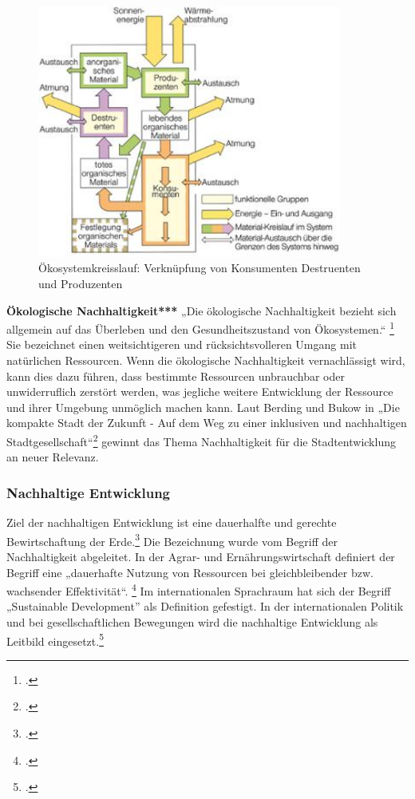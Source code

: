 \documentclass{scrartcl}
\begin{document}
\begin{figure}[htbp]
\centering
\includegraphics[width=10cm]{image_folder/oekosystemkreisslauf.png}
\caption{Ökosystemkreisslauf: Verknüpfung von Konsumenten Destruenten und Produzenten}
\label{fig:Ökosystemkreisslauf}
\end{figure}

\textbf{Ökologische Nachhaltigkeit***}
„Die ökologische Nachhaltigkeit bezieht sich allgemein auf das Überleben und den Gesundheitszustand von Ökosystemen.“ \footcite{DefinitionWirtschaftslexikonc} Sie bezeichnet einen weitsichtigeren und rücksichtsvolleren Umgang mit natürlichen Ressourcen. Wenn die ökologische Nachhaltigkeit vernachlässigt wird, kann dies dazu führen, dass bestimmte Ressourcen unbrauchbar oder unwiderruflich zerstört werden, was jegliche weitere Entwicklung der Ressource und ihrer Umgebung unmöglich machen kann. Laut Berding und Bukow in „Die kompakte Stadt der Zukunft - Auf dem Weg zu einer inklusiven und nachhaltigen Stadtgesellschaft“\footcite[S.95]{BerdingWolf-DietrichBukowKarinCudakHrsgDieStadtgesellschaft} gewinnt das Thema Nachhaltigkeit für die Stadtentwicklung an neuer Relevanz. 



\subsubsection{Nachhaltige Entwicklung} \label{NE}
 Ziel der nachhaltigen Entwicklung ist eine dauerhalfte und gerechte Bewirtschaftung der Erde.\footcite{NachhaltigeBrockhaus.de} Die Bezeichnung wurde vom Begriff der Nachhaltigkeit abgeleitet. In der Agrar- und Ernährungswirtschaft definiert der Begriff eine „dauerhafte Nutzung von Ressourcen bei gleichbleibender bzw. wachsender Effektivität“. \footcite{oppenhauser2010nachhaltigkeit} Im internationalen Sprachraum hat sich der Begriff „Sustainable Development” als Definition gefestigt. In der internationalen Politik und bei gesellschaftlichen Bewegungen wird die nachhaltige Entwicklung als Leitbild eingesetzt.\footcite{oppenhauser2010nachhaltigkeit}
 
\end{document}
